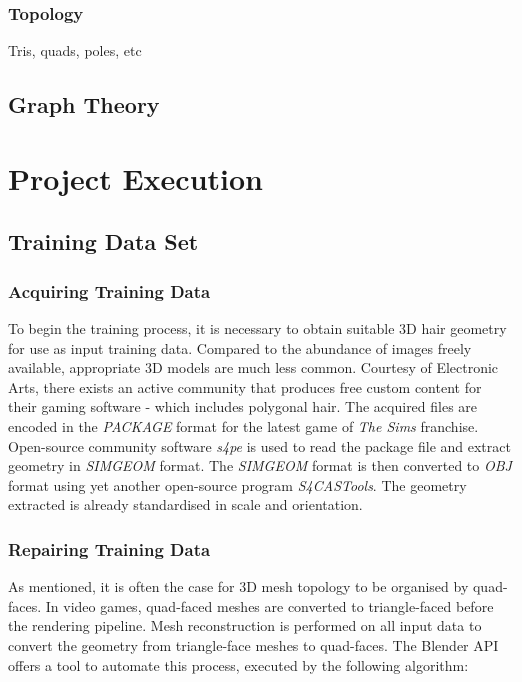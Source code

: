 \documentclass[ %
                    author={Dillon Keith Diep [INCOMPLETE DRAFT, NOT FOR SUBMISSION]},
                supervisor={Dr. Carl Henrik Ek},
                    degree={MEng},
                     title={ARt-CG:},
                  subtitle={Assisted Real-time Content Generation of 3D Hair by Learning Manifolds},
                      type={Research},
                      year={2014} ]{dissertation}
\begin{document}
\subsection{Topology}
Tris, quads, poles, etc

\section{Graph Theory}




\chapter{Project Execution}
\label{chap:execution}

\section{Training Data Set}
\subsection{Acquiring Training Data}
To begin the training process, it is necessary to obtain suitable 3D hair geometry for use as input training data. Compared to the abundance of images freely available, appropriate 3D models are much less common. Courtesy of Electronic Arts, there exists an active community that produces free custom content for their gaming software - which includes polygonal hair. \cite{tsr} The acquired files are encoded in the \textit{PACKAGE} format for the latest game of \textit{The Sims} franchise. Open-source community software \textit{s4pe} is used to read the package file and extract geometry in \textit{SIMGEOM} format. \cite{s4pe} The \textit{SIMGEOM} format is then converted to \textit{OBJ} format using yet another open-source program \textit{S4CASTools}. \cite{s4cas} The geometry extracted is already standardised in scale and orientation.

\subsection{Repairing Training Data}
As mentioned, it is often the case for 3D mesh topology to be organised by quad-faces. In video games, quad-faced meshes are converted to triangle-faced before the rendering pipeline. Mesh reconstruction is performed on all input data to convert the geometry from triangle-face meshes to quad-faces. The Blender API offers a tool to automate this process, executed by the following algorithm:
\end{document}
